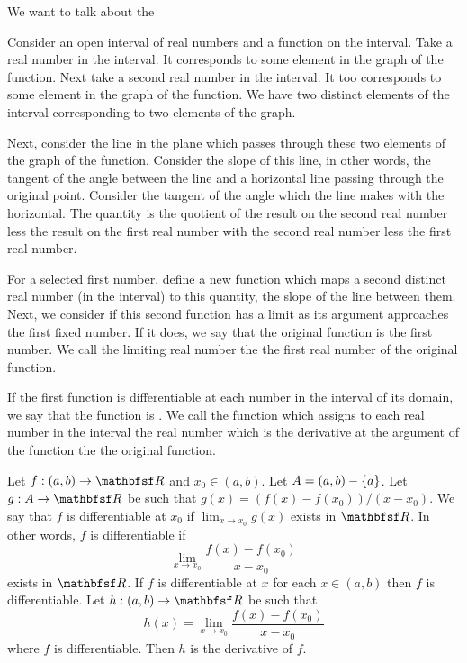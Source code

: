 
\sbasic
















\sstart
{}


We want to talk about
the


Consider an open interval of
real numbers and a function on
the interval.
Take a real number in the interval.
It corresponds to some element in
the graph of the function.
Next take a second real number in the interval.
It too corresponds to some element in
the graph of the function.
We have two distinct elements of the
interval corresponding to two elements of the graph.

Next, consider the line in the plane which passes
through these two elements of the graph of the
function.
Consider the slope of this line, in other words,
the tangent of the angle between the line
and a horizontal line passing through the
original point.
Consider the tangent of the angle which the line
makes with the horizontal.
The quantity is the quotient
of the result on the second real number
less the result on the first real number
with the second real number less the first
real number.

For a selected first number,
define a new function which maps
a second distinct real number (in the interval)
to this quantity, the slope of the line
between them.
Next, we consider if this second function
has a limit as its argument approaches
the first fixed number.
If it does, we say that the original function is
 the first number.
We call the limiting real number the
 the first real number of
the original function.

If the first function is differentiable at
each number in the interval of its domain,
we say that the function is .
We call the function which assigns to each
real number in the interval the real number
which is the derivative at the argument of
the function the  the
original function.


Let $f: (a,b) \to \R$ and $x_0 \in (a, b)$.
Let $A = (a, b) - \{a\}$.
Let $g: A \to \R$ be such that
$g(x) = (f(x) - f(x_0))/(x - x_0)$.
We say that $f$ is differentiable at $x_0$ if
$\lim_{x \to x_0} g(x)$ exists in $\R$.
In other words, $f$ is differentiable if
\[
  \lim_{x \to x_0}
  \frac{f(x) - f(x_0)}{x - x_0}
\]
exists in $\R$.
If $f$ is differentiable at $x$ for each
$x \in (a, b)$ then $f$ is differentiable.
Let $h: (a,b) \to \R$ be such that
\[
  h(x) = \lim_{x \to x_0} \frac{f(x) - f(x_0)}{x - x_0}
\]
where $f$ is differentiable.  Then $h$ is the derivative of $f$.
\strats
